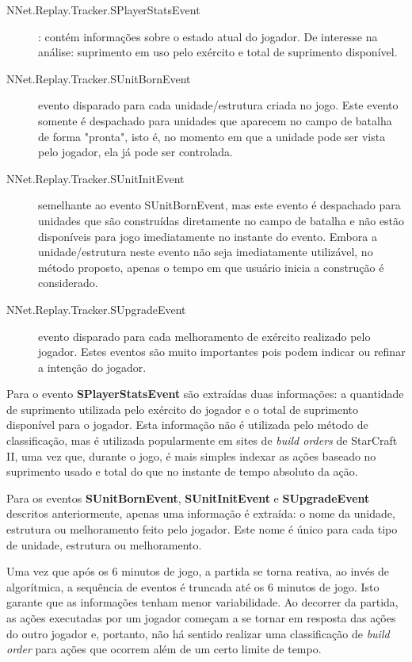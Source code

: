 \begin{description}
	\item[NNet.Replay.Tracker.SPlayerStatsEvent]: contém informações sobre o estado atual do jogador. De interesse na análise: suprimento em uso pelo exército e total de suprimento disponível.
	\item[NNet.Replay.Tracker.SUnitBornEvent] evento disparado para cada unidade/estrutura criada no jogo. Este evento somente é despachado para unidades que aparecem no campo de batalha de forma "pronta", isto é, no momento em que a unidade pode ser vista pelo jogador, ela já pode ser controlada.
	\item[NNet.Replay.Tracker.SUnitInitEvent] semelhante ao evento SUnitBornEvent, mas este evento é despachado para unidades que são construídas diretamente no campo de batalha e não estão disponíveis para jogo imediatamente no instante do evento. Embora a unidade/estrutura neste evento não seja imediatamente utilizável, no método proposto, apenas o tempo em que usuário inicia a construção é considerado.
	\item[NNet.Replay.Tracker.SUpgradeEvent] evento disparado para cada melhoramento de exército realizado pelo jogador. Estes eventos são muito importantes pois podem indicar ou refinar a intenção do jogador.
\end{description}

Para o evento \textbf{SPlayerStatsEvent} são extraídas duas informações: a quantidade de suprimento utilizada pelo exército do jogador e o total de suprimento disponível para o jogador. Esta informação não é utilizada pelo método de classificação, mas é utilizada popularmente em sites de \textit{build orders} de StarCraft II, uma vez que, durante o jogo, é mais simples indexar as ações baseado no suprimento usado e total do que no instante de tempo absoluto da ação.

Para os eventos \textbf{SUnitBornEvent}, \textbf{SUnitInitEvent} e \textbf{SUpgradeEvent} descritos anteriormente, apenas uma informação é extraída: o nome da unidade, estrutura ou melhoramento feito pelo jogador. Este nome é único para cada tipo de unidade, estrutura ou melhoramento.

Uma vez que após os 6 minutos de jogo, a partida se torna reativa, ao invés de algorítmica, a sequência de eventos é truncada até os 6 minutos de jogo. Isto garante que as informações tenham menor variabilidade. Ao decorrer da partida, as ações executadas por um jogador começam a se tornar em resposta das ações do outro jogador e, portanto, não há sentido realizar uma classificação de \textit{build order} para ações que ocorrem além de um certo limite de tempo.


